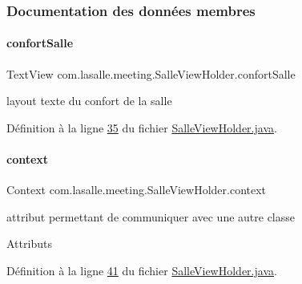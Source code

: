 \subsubsection{Documentation des données membres}
\mbox{\label{classcom_1_1lasalle_1_1meeting_1_1_salle_view_holder_adb1ed56224bf4c72f3b6ceadd1e20da5}} 
\paragraph{\texorpdfstring{confort\+Salle}{confortSalle}}
{\footnotesize\ttfamily Text\+View com.\+lasalle.\+meeting.\+Salle\+View\+Holder.\+confort\+Salle\hspace{0.3cm}{\ttfamily [private]}}



layout texte du confort de la salle 



Définition à la ligne \hyperlink{_salle_view_holder_8java_source_l00035}{35} du fichier \hyperlink{_salle_view_holder_8java_source}{Salle\+View\+Holder.\+java}.

\mbox{\label{classcom_1_1lasalle_1_1meeting_1_1_salle_view_holder_a7072e3d124129f260af7a24c7ad4277d}} 
\paragraph{\texorpdfstring{context}{context}}
{\footnotesize\ttfamily Context com.\+lasalle.\+meeting.\+Salle\+View\+Holder.\+context\hspace{0.3cm}{\ttfamily [private]}}



attribut permettant de communiquer avec une autre classe 

Attributs 

Définition à la ligne \hyperlink{_salle_view_holder_8java_source_l00041}{41} du fichier \hyperlink{_salle_view_holder_8java_source}{Salle\+View\+Holder.\+java}.

